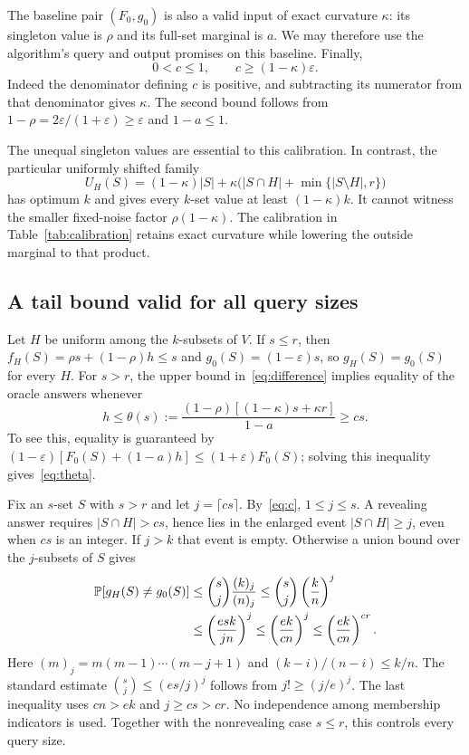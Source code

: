 \documentclass[manuscript,11pt,screen,nonacm]{acmart}
\newcommand{\eps}{\varepsilon}
\newcommand{\Prb}{\mathbb P}
\begin{document}
The baseline pair $(F_0,g_0)$ is also a valid input of exact curvature
$\kappa$: its singleton value is $\rho$ and its full-set marginal is $a$.
We may therefore use the algorithm's query and output promises on this
baseline. Finally,
\begin{equation}\label{eq:c}
 0<c\le1,\qquad c\ge(1-\kappa)\eps.
\end{equation}
Indeed the denominator defining $c$ is positive, and subtracting its
numerator from that denominator gives $\kappa$. The second bound follows
from $1-\rho=2\eps/(1+\eps)\ge\eps$ and $1-a\le1$.

The unequal singleton values are essential to this calibration. In contrast,
the particular uniformly shifted family
\[
 U_H(S)=(1-\kappa)|S|+
             \kappa\bigl(|S\cap H|+\min\{|S\setminus H|,r\}\bigr)
\]
has optimum $k$ and gives every $k$-set value at least $(1-\kappa)k$.
It cannot witness the smaller fixed-noise factor $\rho(1-\kappa)$.
The calibration in Table~\ref{tab:calibration} retains exact curvature
while lowering the outside marginal to that product.

\subsection{A tail bound valid for all query sizes}

Let $H$ be uniform among the $k$-subsets of $V$.
If $s\le r$, then $f_H(S)=\rho s+(1-\rho)h\le s$ and
$g_0(S)=(1-\eps)s$, so $g_H(S)=g_0(S)$ for every $H$.
For $s>r$, the upper bound in~\eqref{eq:difference} implies equality
of the oracle answers whenever
\begin{equation}\label{eq:theta}
 h\le\theta(s):=
 \frac{(1-\rho)[(1-\kappa)s+\kappa r]}{1-a}\ge cs.
\end{equation}
To see this, equality is guaranteed by
$(1-\eps)[F_0(S)+(1-a)h]\le(1+\eps)F_0(S)$;
solving this inequality gives~\eqref{eq:theta}.

Fix an $s$-set $S$ with $s>r$ and let $j=\lceil cs\rceil$.
By~\eqref{eq:c}, $1\le j\le s$. A revealing answer requires
$|S\cap H|>cs$, hence lies in the enlarged event
$|S\cap H|\ge j$, even when $cs$ is an integer. If $j>k$ that event
is empty. Otherwise a union bound over the $j$-subsets of $S$ gives
\begin{align}
 \Prb[g_H(S)\ne g_0(S)]
 &\le \binom{s}{j}\frac{(k)_j}{(n)_j}
 \le \binom{s}{j}\left(\frac{k}{n}\right)^j \notag\\
 &\le\left(\frac{e s k}{j n}\right)^j
 \le\left(\frac{e k}{cn}\right)^j
 \le\left(\frac{e k}{cn}\right)^{cr}.             \label{eq:tail}
\end{align}
Here $(m)_j=m(m-1)\cdots(m-j+1)$ and
$(k-i)/(n-i)\le k/n$. The standard estimate
$\binom{s}{j}\le(e s/j)^j$ follows from $j!\ge(j/e)^j$.
The last inequality uses $cn>e k$ and $j\ge cs>cr$.
No independence among membership indicators is used.
Together with the nonrevealing case $s\le r$, this controls every query size.
\end{document}
